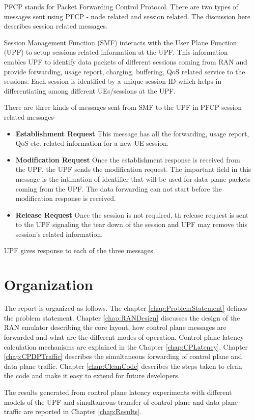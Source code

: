 PFCP stands for Packet Forwarding Control Protocol. 
 There are two types of messages sent using PFCP - node related and session related.
 The discussion here describes session related messages.

 Session Management Function (SMF) interacts with the User Plane Function (UPF) to setup sessions related 
 information at the UPF.
This  information enables UPF to identify data packets of different sessions coming from RAN 
and provide forwarding, usage report, charging, buffering, QoS related service to the sessions.
Each session is identified by a unique session ID which helps in differentiating 
among different UEs/sessions at the UPF. 

There are three kinds of messages sent from SMF to the UPF in PFCP session related messages-
\begin{itemize}
	\item \textbf{Establishment Request} This message has all the forwarding, usage report, QoS etc. related information for  a new UE session.  
	\item \textbf{Modification Request} Once the establishment response is
	received from the UPF, the UPF sends the modification request. The important field in this message is the intimation of identifier that will be used for data plane packets coming from the UPF. The data forwarding can not start before the modification response is received.
	\item \textbf{Release Request} Once the session is not required, th release 
	request is sent to the UPF signaling the tear down of the session and UPF
	 may remove this session's related information.
\end{itemize}
UPF gives response to each of the three messages. 

\section {Organization \label{sec:Organization}}

The report is organized as follows.
The chapter \ref{chap:ProblemStatement} defines the problem statement. Chapter 
\ref{chap:RANDesign} discusses the  design of the RAN emulator describing the core
 layout, how control plane messages are forwarded and what are the different modes
  of operation. Control plane latency calculation mechanisms are explained in  the
   Chapter \ref{chap:CPLatency}. Chapter \ref{chap:CPDPTraffic} describes the
    simultaneous forwarding of control plane and data plane traffic. Chapter \ref{chap:CleanCode}  describes the steps
    taken to clean the code and make it easy to extend for future developers. 
    
     The results generated from control plane latency experiments with different models of the UPF and simultaneous transfer of control plane and data plane traffic are reported in Chapter \ref{chap:Results}.